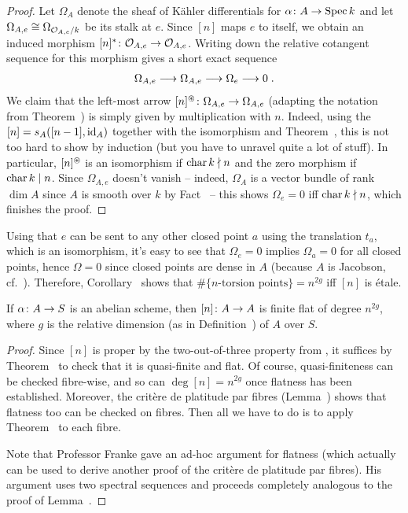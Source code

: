 \documentclass[a4paper,parskip=half,numbers=enddot, DIV=12]{scrreprt}
\begin{document}
\begin{proof}
	Let $\Omega_A$ denote the sheaf of Kähler differentials for $\alpha\colon A\morphism\Spec k$ and let $\Omega_{A,e}\cong \Omega_{\mathcal{O}_{A,e}/k}$ be its stalk at $e$. Since $[n]$ maps $e$ to itself, we obtain an induced morphism $[n]^*\colon \Oo_{A,e}\morphism\Oo_{A,e}$. Writing down the relative cotangent sequence for this morphism gives a short exact sequence
	\begin{align*}
		\Omega_{A,e}\morphism \Omega_{A,e}\morphism \Omega_e\morphism 0\;.
	\end{align*}
	We claim that the left-most arrow $[n]^\oast\colon \Omega_{A,e}\morphism\Omega_{A,e}$ (adapting the notation from Theorem~) is simply given by multiplication with $n$. Indeed, using the $[n]=s_A([n-1],\operatorname{id}_A)$ together with the isomorphism  and Theorem~, this is not too hard to show by induction (but you have to unravel quite a lot of stuff). In particular, $[n]^\oast$ is an isomorphism if $\operatorname{char} k\nmid n$ and the zero morphism if $\operatorname{char} k\mid n$. Since $\Omega_{A,e}$ doesn't vanish -- indeed, $\Omega_A$ is a vector bundle of rank $\dim A$ since $A$ is smooth over $k$ by Fact~ -- this shows $\Omega_e=0$ iff $\operatorname{char} k\nmid n$, which finishes the proof.
\end{proof}
\begin{rem*}
	Using that $e$ can be sent to any other closed point $a$ using the translation $t_a$, which is an isomorphism, it's easy to see that $\Omega_e=0$ implies $\Omega_a=0$ for all closed points, hence $\Omega=0$ since closed points are dense in $A$ (because $A$ is Jacobson, cf.\ \cite[Definition~2.4.2]{alggeo1}). Therefore, Corollary~ shows that $\#\{n\text{-torsion points}\}=n^{2g}$ iff $[n]$ is étale.
\end{rem*}
\begin{cor}
	If $\alpha\colon A\morphism S$ is an abelian scheme, then $[n]\colon A\morphism A$ is finite flat of degree $n^{2g}$, where $g$ is the relative dimension (as in Definition~) of $A$ over $S$.
\end{cor}
\begin{proof}
	Since $[n]$ is proper by the two-out-of-three property from \cite[Proposition~2.4.1]{alggeo2}, it suffices by Theorem~ to check that it is quasi-finite and flat. Of course, quasi-finiteness can be checked fibre-wise, and so can $\deg{[n]}=n^{2g}$ once flatness has been established. Moreover, the critère de platitude par fibres (Lemma~) shows that flatness too can be checked on fibres. Then all we have to do is to apply Theorem~ to each fibre.
	
	Note that Professor Franke gave an ad-hoc argument for flatness (which actually can be used to derive another proof of the critère de platitude par fibres). His argument uses two spectral sequences and proceeds completely analogous to the proof of Lemma~.
\end{proof}
\end{document}

